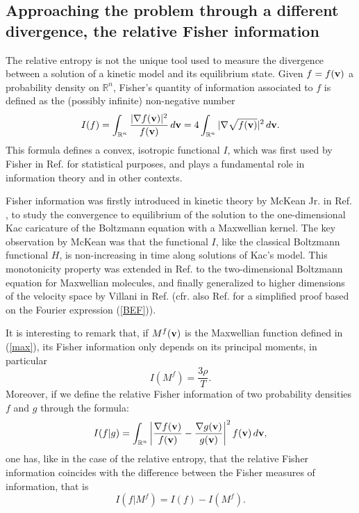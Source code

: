\documentclass{article}
\newcommand{\bv}{\mathrm{BV}}
\newcommand{\fer}[1]{(\ref{#1})}
\newcommand{\R}{\mathbb R}
\def\R{\mathbb{R}}
\def\bv{{\bf v}}
\begin{document}
 



\subsection{Approaching the problem through a different divergence, the relative Fisher information}

The relative entropy is not the unique tool used to measure the divergence between a solution of a kinetic model and its equilibrium state.
% 
Given $f= f(\bv)$ a probability density on $\R^n$, Fisher’s quantity of information associated to $f$ is defined as the (possibly infinite) non-negative number
% 
\begin{equation}
    \label{Fisher}
    I(f) = \int_{\R^n}\frac{|\nabla f(\bv)|^2}{f(\bv)} \, d\bv = 4\int_{\R^n}|\nabla \sqrt{f(\bv)}|^2 \, d\bv.
\end{equation}
% 
This formula defines a convex, isotropic functional $I$, which was first used by Fisher in Ref. \cite{Fish} for statistical purposes, and plays a fundamental role in information theory and in other contexts.\cite{Vil3}
% 

% 
% 
Fisher information was firstly introduced in kinetic theory by McKean Jr. in Ref. \cite{McK}, to study the convergence to equilibrium of the solution to the one-dimensional Kac caricature of the Boltzmann equation with a Maxwellian kernel.
%
% 
The key observation by McKean was that the functional $I$, like the classical Boltzmann functional $H$, is non-increasing in time along solutions of Kac’s model. 
% 
This monotonicity property was extended in Ref. \cite{BT} to the two-dimensional Boltzmann equation for Maxwellian molecules, and finally generalized to higher dimensions of the velocity space by Villani in Ref. \cite{Vil1} (cfr. also Ref. \cite{MT} for a simplified proof based on the Fourier expression \fer{BEF}). 
% 

% 
It is interesting to remark that, if $M^f(\bv)$ is the Maxwellian function defined in \fer{max}, its Fisher information only depends on its principal moments, in particular
% 
\[
    I(M^f) = \frac{3\rho}{T}.
\]
% 
Moreover, if we define the relative Fisher information of two probability densities $f$ and $g$ through the formula: 
% 
\begin{equation} 
    \label{rel-Fish}
    I(f|g) =\int_{\R^n}\left| \frac{\nabla f(\bv)}{f(\bv)} - \frac{\nabla g(\bv)}{g(\bv)}\right|^2 f(\bv) \, d\bv,
\end{equation}
% 
one has, like in the case of the relative entropy, that the relative Fisher information coincides with the difference between the Fisher measures of information, that is
% 
\[
    I(f|M^f) = I(f) -I(M^f).
\]
\end{document}
